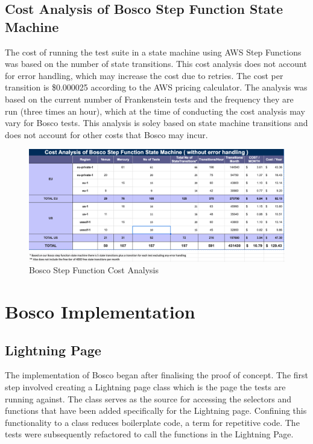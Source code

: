 \documentclass[12pt,a4paper,titlepage]{report}
\begin{document}
\clearpage
\section{Cost Analysis of Bosco Step Function State Machine}

The cost of running the test suite in a state machine using AWS Step Functions was based on the number of state transitions.\autocite{Amazon} 
This cost analysis does not account for error handling, which may increase the cost due to retries. The cost per transition is \$0.000025 according to the AWS pricing calculator. 
The analysis was based on the current number of Frankenstein tests and the frequency they are run (three times an hour), which at the time of conducting the cost analysis may vary for Bosco tests.
This analysis is soley based on state machine transitions and does not account for other costs that Bosco may incur.

\begin{figure}[H]
 \centering
 \includegraphics[width=15cm]{./diagrams/sfcost}
 \caption{Bosco Step Function Cost Analysis}
\end{figure}

\chapter{Bosco Implementation}
\section{Lightning Page}
The implementation of Bosco began after finalising the proof of concept. 
The first step involved creating a Lightning page class which is the page the tests are running against. 
The class serves as the source for accessing the selectors and functions that have been added specifically for the Lightning page. 
Confining this functionality to a class reduces boilerplate code, a term for repetitive code. 
The tests were subsequently refactored to call the functions in the Lightning Page.
\end{document}
